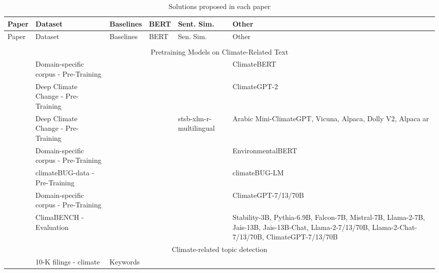 
\begin{longtable}[c]{lp{3cm}p{1.5cm}p{3cm}p{1.5cm}p{3cm}}
    \caption{Solutions proposed in each paper}
    \label{tab:models}
    \\
    \toprule
    Paper & Dataset & Baselines & BERT & Sent. Sim. & Other \\
    \midrule
    \endfirsthead
    
    \midrule
    Paper & Dataset & Baselines & BERT & Sen. Sim. & Other \\
    \midrule
    \endhead
    
    \endfoot
    
&&&&&\\
    \multicolumn{6}{c}{Pretraining Models on Climate-Related Text} \\
    \midrule
    \citet{nicolas_webersinke_climatebert_2021} & \raggedright Domain-specific corpus - Pre-Training  &  &  &  & ClimateBERT \\

    \citet{vaghefi2022deep} & \raggedright Deep Climate Change - Pre-Training &   &  &  & ClimateGPT-2 \\

    \citet{mullappilly-etal-2023-arabic} & \raggedright Deep Climate Change - Pre-Training &   &  & \raggedright stsb-xlm-r-multilingual & Arabic Mini-ClimateGPT, Vicuna,  Alpaca, Dolly V2, Alpaca ar \\

    \citet{schimanski_bridging_2023} & \raggedright Domain-specific corpus - Pre-Training &   &  &  & EnvironmentalBERT \\

    \citet{yu_climatebug_2024} & climateBUG-data  - Pre-Training &   & &  & climateBUG-LM  \\

    \citet{thulke2024climategpt} & \raggedright Domain-specific corpus - Pre-Training &   &  &  & ClimateGPT-7/13/70B \\

    \citet{thulke2024climategpt} & \raggedright ClimaBENCH - Evaluation &   &  & &   {\tiny Stability-3B, Pythia-6.9B, Falcon-7B, Mistral-7B, Llama-2-7B, Jais-13B, Jais-13B-Chat, Llama-2-7/13/70B, Llama-2-Chat-7/13/70B, ClimateGPT-7/13/70B}  \\

    \multicolumn{6}{c}{Climate-related topic detection} \\
    \midrule
    \citet{doran_risk_disclosure} & \raggedright 10-K filings - climate &  Keywords &  &  &  \\


\end{longtable}
